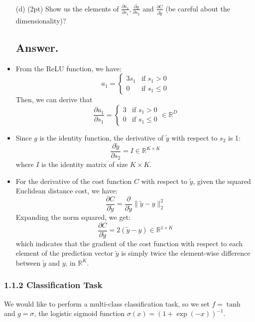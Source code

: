 \documentclass{article}
\begin{document}
\begin{itemize}
        
  
        
    \item[(d)] (2pt) Show us the elements of $\frac{\partial a_1}{\partial s_1}, \frac{\partial \tilde{y}}{\partial s_2}$ and $\frac{\partial C}{\partial \tilde{y}}$ (be careful about the dimensionality)?
    \subsection*{Answer.}
    \item From the ReLU function, we have:
    \[a_1 = 
    \begin{cases}
    3s_1 & \text{if } s_{1} > 0 \\
    0 & \text{if } s_{1} \leq 0
    \end{cases}
    \]
    Then, we can derive that 
    \[ \frac{\partial a_1}{\partial s_1} = 
    \begin{cases}
    3 & \text{if } s_{1} > 0 \\
    0 & \text{if } s_{1} \leq 0
    \end{cases}
    \in \mathbb{R}^{D}
    \]
    
    \item Since \(g\) is the identity function, the derivative of \(\tilde{y}\) with respect to \(s_2\) is 1:
    \[ \frac{\partial \tilde{y}}{\partial s_2} = I \in \mathbb{R}^{K \times K} \]
    where \(I\) is the identity matrix of size \(K \times K\).
    
    \item For the derivative of the cost function \(C\) with respect to \(\tilde{y}\), given the squared Euclidean distance cost, we have:
    \[ \frac{\partial C}{\partial \tilde{y}} = \frac{\partial}{\partial \tilde{y}} \| \tilde{y} - y \|_2^2 \]
    Expanding the norm squared, we get:
    \[ \frac{\partial C}{\partial \tilde{y}} = 2 (\tilde{y} - y) \in \mathbb{R}^{1 \times K} \]
    which indicates that the gradient of the cost function with respect to each element of the prediction vector \(\tilde{y}\) is simply twice the element-wise difference between \(\tilde{y}\) and \(y\), in \(\mathbb{R}^K\).
    
\end{itemize}

\subsubsection*{1.1.2 Classification Task}

We would like to perform a multi-class classification task, so we set $f = \tanh$ and $g = \sigma$, the logistic sigmoid function $\sigma(x) = ({1 + \exp(-x)})^{-1}$.
\end{document}
